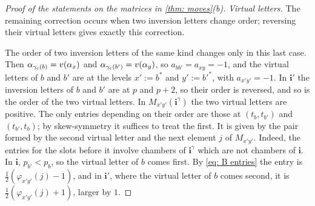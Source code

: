 \documentclass[a4paper]{amsart}
\numberwithin{equation}{section}
\theoremstyle{definition}
\theoremstyle{remark}
\newcommand{\bfi}{\mathbf{i}}
\newcommand{\cc}{{\rm c}}
\begin{document}
\begin{proof}[Proof of the statements on the matrices in \cref{thm: moves}(b)]
  \emph{Virtual letters.}
The remaining correction occurs when two inversion letters change order; reversing their virtual letters gives exactly this correction.

  The order of two inversion letters of the same kind changes only in this last case.
  Then $\alpha_{\gamma_{\cc}(b)}=v(\alpha_x)$ and $\alpha_{\gamma_{\cc}(b')}=v(\alpha_y)$, so $a_{bb'}=a_{xy}=-1$, and the virtual letters of $b$ and $b'$ are at the levels $x':=b^*$ and $y':=b'^*$, with $a_{x'y'}=-1$.
  In $\bfi'$ the inversion letters of $b$ and $b'$ are at $p$ and $p+2$, so their order is reversed, and so is the order of the two virtual letters.
  In $M_{x'y'}(\bfi^\gamma)$ the two virtual letters are positive.
  The only entries depending on their order are those at $(t_b,t_{b'})$ and $(t_{b'},t_b)$; by skew-symmetry it suffices to treat the first.
  It is given by the pair formed by the second virtual letter and the next element $j$ of $M_{x'y'}$.
  Indeed, the entries for the slots before it involve chambers of $\bfi^\gamma$ which are not chambers of $\bfi$.
  In $\bfi$, $p_{b'}<p_b$, so the virtual letter of $b$ comes first.
  By \eqref{eq: B entries} the entry is $\frac12(\varphi_{x'y'}(j)-1)$, and in $\bfi'$, where the virtual letter of $b$ comes second, it is $\frac12(\varphi_{x'y'}(j)+1)$, larger by $1$.
\end{proof}
\end{document}
